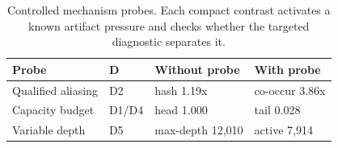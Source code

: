 \begin{table}
\caption{Controlled mechanism probes. Each compact contrast activates a known artifact pressure and checks whether the targeted diagnostic separates it.}
\label{tab:mechanism-probes}
\begin{tabular}{llll}
\toprule
Probe & D & Without probe & With probe \\
\midrule
Qualified aliasing & D2 & hash 1.19x & co-occur 3.86x \\
Capacity budget & D1/D4 & head 1.000 & tail 0.028 \\
Variable depth & D5 & max-depth 12,010 & active 7,914 \\
\bottomrule
\end{tabular}
\end{table}

